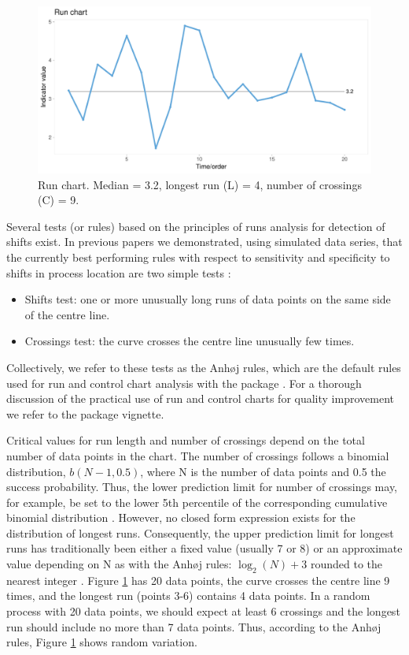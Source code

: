 \begin{figure}[htbp]
  \centering
  \includegraphics[width=\textwidth]{fig_run.pdf}
  \caption{Run chart. Median = 3.2, longest run (L) = 4, number of crossings (C) = 9.}
  \label{figure:run}
\end{figure}

Several tests (or rules) based on the principles of runs analysis for
detection of shifts exist. In previous papers we demonstrated, using
simulated data series, that the currently best performing rules with
respect to sensitivity and specificity to shifts in process location are
two simple tests \citep{anhoej2014, anhoej2015, anhoej2018}:

\begin{itemize}
\item
  Shifts test: one or more unusually long runs of data points on the
  same side of the centre line.
\item
  Crossings test: the curve crosses the centre line unusually few times.
\end{itemize}

Collectively, we refer to these tests as the Anhøj rules, which are the
default rules used for run and control chart analysis with the
 package \citep{qicharts2}. For a thorough discussion
of the practical use of run and control charts for quality improvement
we refer to the  package vignette.

Critical values for run length and number of crossings depend on the
total number of data points in the chart. The number of crossings
follows a binomial distribution, \(b(N - 1, 0.5)\), where N is the
number of data points and 0.5 the success probability. Thus, the lower
prediction limit for number of crossings may, for example, be set to the
lower 5th percentile of the corresponding cumulative binomial
distribution \citep{chen2010}. However, no closed form expression exists
for the distribution of longest runs. Consequently, the upper prediction
limit for longest runs has traditionally been either a fixed value
(usually 7 or 8) \citep{carey2002a} or an approximate value depending on
N as with the Anhøj rules: \(\log_2(N) + 3\) rounded to the nearest
integer \citep{schilling2012}. Figure \ref{figure:run} has 20 data
points, the curve crosses the centre line 9 times, and the longest run
(points 3-6) contains 4 data points. In a random process with 20 data
points, we should expect at least 6 crossings and the longest run should
include no more than 7 data points. Thus, according to the Anhøj rules,
Figure \ref{figure:run} shows random variation.

